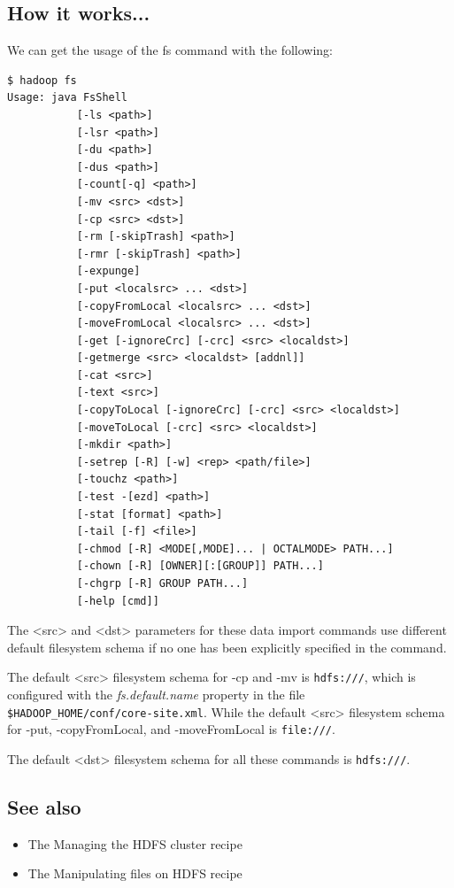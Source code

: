 \subsection*{How it works...}
We can get the usage of the fs command with the following:
\begin{verbatim}
$ hadoop fs
Usage: java FsShell
           [-ls <path>]
           [-lsr <path>]
           [-du <path>]
           [-dus <path>]
           [-count[-q] <path>]
           [-mv <src> <dst>]
           [-cp <src> <dst>]
           [-rm [-skipTrash] <path>]
           [-rmr [-skipTrash] <path>]
           [-expunge]
           [-put <localsrc> ... <dst>]
           [-copyFromLocal <localsrc> ... <dst>]
           [-moveFromLocal <localsrc> ... <dst>]
           [-get [-ignoreCrc] [-crc] <src> <localdst>]
           [-getmerge <src> <localdst> [addnl]]
           [-cat <src>]
           [-text <src>]
           [-copyToLocal [-ignoreCrc] [-crc] <src> <localdst>]
           [-moveToLocal [-crc] <src> <localdst>]
           [-mkdir <path>]
           [-setrep [-R] [-w] <rep> <path/file>]
           [-touchz <path>]
           [-test -[ezd] <path>]
           [-stat [format] <path>]
           [-tail [-f] <file>]
           [-chmod [-R] <MODE[,MODE]... | OCTALMODE> PATH...]
           [-chown [-R] [OWNER][:[GROUP]] PATH...]
           [-chgrp [-R] GROUP PATH...]
           [-help [cmd]]
\end{verbatim}

The <src> and <dst> parameters for these data import commands use different default filesystem schema if no one has been explicitly specified in the command.

The default <src> filesystem schema for -cp and -mv is \verb|hdfs:///|, which is configured with the \emph{fs.default.name} property in the file \verb|$HADOOP_HOME/conf/core-site.xml|. While the default <src> filesystem schema for -put, -copyFromLocal, and -moveFromLocal is \verb|file:///|.

The default <dst> filesystem schema for all these commands is \verb|hdfs:///|.

\subsection*{See also}
  \begin{itemize}
  \item The Managing the HDFS cluster recipe
  \item The Manipulating files on HDFS recipe
\end{itemize}

